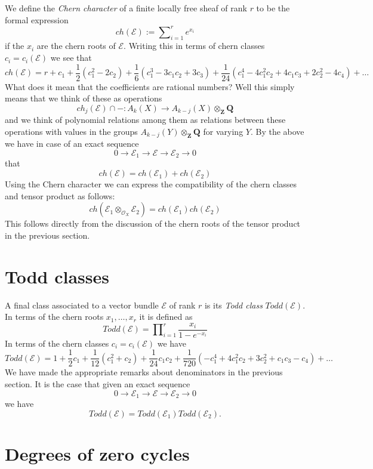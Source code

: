 \noindent
We define the {\it Chern character} of a finite locally free
sheaf of rank $r$ to be the formal expression
$$
ch({\mathcal E}) := \sum\nolimits_{i=1}^r e^{x_i}
$$
if the $x_i$ are the chern roots of ${\mathcal E}$. Writing this in
terms of chern classes $c_i = c_i(\mathcal{E})$
we see that
$$
ch(\mathcal{E}) =
r
+
c_1
+
\frac{1}{2}(c_1^2 - 2c_2)
+
\frac{1}{6}(c_1^3 - 3c_1c_2 + 3c_3)
+
\frac{1}{24}(c_1^4 - 4c_1^2c_2 + 4c_1c_3 + 2c_2^2 - 4c_4)
+
\ldots
$$
What does it mean that the coefficients are rational numbers?
Well this simply means that we think of these as operations
$$
ch_j(\mathcal{E}) \cap - :
A_k(X)
\longrightarrow
A_{k - j}(X) \otimes_{\mathbf{Z}} \mathbf{Q}
$$
and we think of polynomial relations among them as relations
between these operations with values in the groups
$A_{k - j}(Y) \otimes_{\mathbf{Z}} \mathbf{Q}$ for varying $Y$.
By the above
we have in case of an exact sequence
$$
0
\to
{\mathcal E}_1
\to
{\mathcal E}
\to
{\mathcal E}_2
\to
0
$$
that
$$
ch({\mathcal E}) = ch({\mathcal E}_1) + ch({\mathcal E}_2)
$$
Using the Chern character we can express the compatibility
of the chern classes and tensor product as follows:
$$
ch({\mathcal E}_1 \otimes_{{\mathcal O}_X} {\mathcal E}_2) =
ch({\mathcal E}_1) ch({\mathcal E}_2)
$$
This follows directly from the discussion of the chern roots
of the tensor product in the previous section.


\section{Todd classes}
\label{section-todd-classes}

\noindent
A final class associated to a vector bundle $\mathcal{E}$
of rank $r$ is its {\it Todd class} $Todd(\mathcal{E})$.
In terms of the chern roots $x_1, \ldots, x_r$ it is
defined as
$$
Todd(\mathcal{E})
=
\prod\nolimits_{i = 1}^r
\frac{x_i}{1 - e^{-x_i}}
$$
In terms of the chern classes $c_i = c_i(\mathcal{E})$
we have
$$
Todd(\mathcal{E})
=
1
+
\frac{1}{2}c_1
+
\frac{1}{12}(c_1^2 + c_2)
+
\frac{1}{24}c_1c_2
+
\frac{1}{720}(-c_1^4 + 4c_1^2c_2 + 3c_2^2 + c_1c_3 - c_4)
+
\ldots
$$
We have made the appropriate remarks about denominators
in the previous section. It is the case that
given an exact sequence
$$
0
\to
{\mathcal E}_1
\to
{\mathcal E}
\to
{\mathcal E}_2
\to
0
$$
we have
$$
Todd({\mathcal E}) = Todd({\mathcal E}_1) Todd({\mathcal E}_2).
$$




\section{Degrees of zero cycles}
\label{section-degree-zero-cycles}

